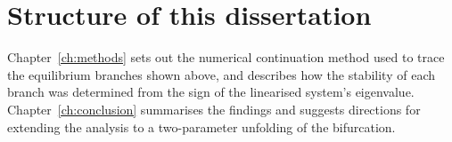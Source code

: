 \section{Structure of this dissertation}

Chapter~\ref{ch:methods} sets out the numerical continuation method used
to trace the equilibrium branches shown above, and describes how the
stability of each branch was determined from the sign of the linearised
system's eigenvalue. Chapter~\ref{ch:conclusion} summarises the findings
and suggests directions for extending the analysis to a two-parameter
unfolding of the bifurcation.
